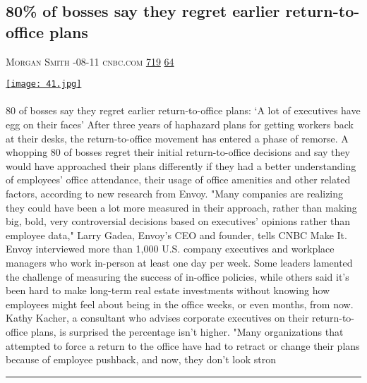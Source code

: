\documentclass[10pt,a4paper]{article}
\begin{document}
\begin{multicols}{2}

\noindent\begin{minipage}{\linewidth}
\subsection{80\% of bosses say they regret earlier return-to-office plans}
\textsc{\footnotesize
{\scriptsize\faUser}\space 
Morgan Smith 
{\scriptsize\faCalendar}-08-11 
{\scriptsize\faGlobe}\space 
cnbc.com 
{\scriptsize\faThumbsOUp}\space 
\href{http://news.ycombinator.com/item?id=37093854\&utm\_term=comment}{719} 
{\scriptsize\faComments}\space 
\href{http://news.ycombinator.com/item?id=37093854\&utm\_term=comment}{64} 
}
\par\medskip\noindent
\href{https://www.cnbc.com/2023/08/11/80percent-of-bosses-say-they-regret-earlier-return-to-office-plans.html?utm\_source=hackernewsletter\&utm\_medium=email\&utm\_term=working}{
    \texttt{[image: 41.jpg]}
}
\end{minipage}
\paragraph{}
80 of bosses say they regret earlier return-to-office plans: ‘A lot of executives have egg on their faces’
After three years of haphazard plans for getting workers back at their desks, the return-to-office movement has entered a phase of remorse.
A whopping 80 of bosses regret their initial return-to-office decisions and say they would have approached their plans differently if they had a better understanding of employees' office attendance, their usage of office amenities and other related factors, according to new research from Envoy.
"Many companies are realizing they could have been a lot more measured in their approach, rather than making big, bold, very controversial decisions based on executives' opinions rather than employee data," Larry Gadea, Envoy's CEO and founder, tells CNBC Make It.
Envoy interviewed more than 1,000 U.S. company executives and workplace managers who work in-person at least one day per week.
Some leaders lamented the challenge of measuring the success of in-office policies, while others said it's been hard to make long-term real estate investments without knowing how employees might feel about being in the office weeks, or even months, from now.
Kathy Kacher, a consultant who advises corporate executives on their return-to-office plans, is surprised the percentage isn't higher.
"Many organizations that attempted to force a return to the office have had to retract or change their plans because of employee pushback, and now, they don't look stron
\par\noindent\textcolor{red}{\rule{\linewidth}{0.2mm}}
\vfill
\null
\noindent\begin{minipage}{\linewidth}

\end{minipage}
\end{multicols}
\end{document}
